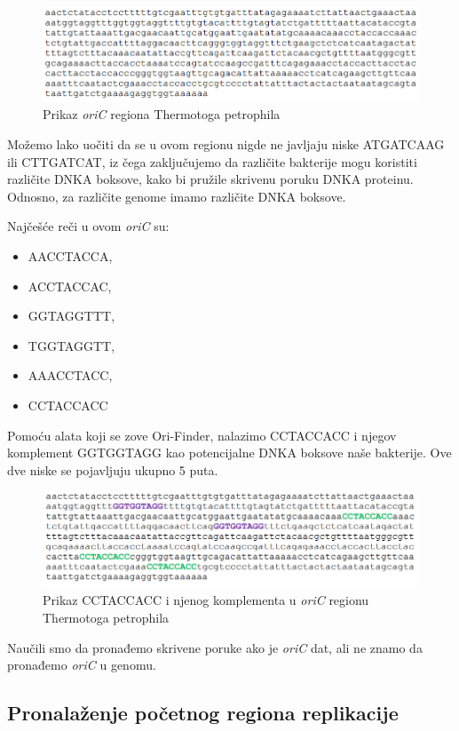 \begin{figure}[h]
\caption{Prikaz \textit{oriC} regiona Thermotoga petrophila}
\centering
\includegraphics[width=1\textwidth]{poglavlja/1/slike/OriC_TP.png}
\end{figure} 

Možemo lako uočiti da se u ovom regionu nigde ne javljaju niske ATGATCAAG ili CTTGATCAT, iz čega zaključujemo da različite bakterije mogu koristiti različite DNKA boksove, kako bi pružile skrivenu poruku DNKA proteinu. Odnosno, za različite genome imamo različite DNKA boksove.

Najčešće reči u ovom \textit{oriC} su:
\begin{itemize}
	\item AACCTACCA, 
	\item ACCTACCAC,
	\item GGTAGGTTT,
	\item TGGTAGGTT,
	\item AAACCTACC,
	\item CCTACCACC
\end{itemize}

Pomoću alata koji se zove Ori-Finder, nalazimo CCTACCACC i njegov komplement GGTGGTAGG kao potencijalne DNKA boksove naše bakterije. Ove dve niske se pojavljuju ukupno 5 puta.

\begin{figure}[h]
\caption{Prikaz CCTACCACC i njenog komplementa u \textit{oriC} regionu Thermotoga petrophila}
\centering
\includegraphics[width=1\textwidth]{poglavlja/1/slike/TP.png}
\end{figure} 
Naučili smo da pronađemo skrivene poruke ako je \textit{oriC}
dat, ali ne znamo da pronađemo \textit{oriC} u genomu.

\subsection{Pronalaženje početnog regiona replikacije}

